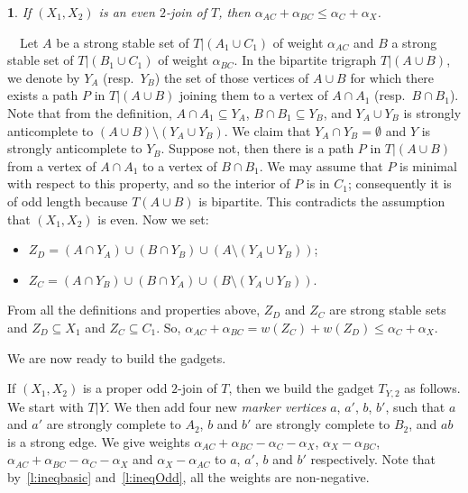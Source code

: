 \documentclass[11 pt] {article}
\newcommand\blackslug{\hbox{\hskip 1pt \vrule width 4pt height 8pt depth 1.5pt
        \hskip 1pt}}
\newcommand\bbox{\hfill \quad \blackslug \medbreak}
\newtheorem{lemma}[theorem]{}
\newcounter{claim}
\newcommand{\Proof}{\setcounter{claim}{0}\noindent{\bf Proof.}\ \ }
\begin{document}
\begin{lemma}
  \label{l:ineqEven}
  If $(X_1, X_2)$ is an even $2$-join of $T$, then
  $\alpha_{AC}+\alpha_{BC} \leq \alpha_{C}+\alpha_{X}$.
\end{lemma}

\Proof Let $A$ be a strong stable set of $T| (A_1 \cup C_1)$ of weight
$\alpha_{AC}$ and $B$ a strong stable set of $T | (B_1 \cup C_1)$ of
weight $\alpha_{BC}$.  In the bipartite trigraph $T | (A\cup B)$, we
denote by $Y_A$ (resp.\ $Y_B$) the set of those vertices of $A\cup B$
for which there exists a path $P$ in $T | (A \cup B)$ joining them to
a vertex of $A \cap A_1$ (resp.\ $B \cap B_1$).  Note that from the
definition, $A \cap A_1 \subseteq Y_A$, $B \cap B_1 \subseteq Y_B$,
and $Y_A\cup Y_B$ is strongly anticomplete to $(A\cup B)\setminus (Y_A
\cup Y_B)$.  We claim that $Y_A \cap Y_B = \emptyset$ and $Y$ is
strongly anticomplete to $Y_B$. Suppose not, then there is a path $P$
in $T | (A\cup B)$ from a vertex of $A \cap A_1$ to a vertex of $B
\cap B_1$.  We may assume that $P$ is minimal with respect to this
property, and so the interior of $P$ is in $C_1$; consequently it is
of odd length because $T (A\cup B)$ is bipartite.  This contradicts
the assumption that $(X_1, X_2)$ is even.  Now we set:

  \begin{itemize}
  \item $Z_D = (A \cap Y_A) \cup (B \cap Y_B) \cup (A \setminus (Y_A \cup Y_B))$;
  \item $Z_C = (A \cap Y_B) \cup (B \cap Y_A) \cup (B \setminus (Y_A \cup Y_B))$.
  \end{itemize}

  From all the definitions and properties above, $Z_D$ and $Z_C$ are
  strong stable sets and $Z_D \subseteq X_1$ and $Z_C \subseteq C_1$.
  So, $\alpha_{AC}+\alpha_{BC} = w(Z_C) + w(Z_D) \leq
  \alpha_{C}+\alpha_{X}$.  \bbox






We are now ready to build the gadgets. 

If $(X_1,X_2)$ is a proper odd $2$-join of $T$, then we build the
gadget $T_{Y,2}$ as follows. We start with $T |Y$. We then add four
new \emph{marker vertices} $a$, $a'$, $b$, $b'$, such that $a$ and
$a'$ are strongly complete to $A_2$, $b$ and $b'$ are strongly
complete to $B_2$, and $ab$ is a strong edge.  We give weights
$\alpha_{AC} + \alpha_{BC} - \alpha_{C} - \alpha_{X}$, $\alpha_X -
\alpha_{BC}$, $\alpha_{AC} + \alpha_{BC} - \alpha_{C} - \alpha_{X}$
and $\alpha_X - \alpha_{AC}$ to $a$, $a'$, $b$ and $b'$ respectively.
Note that by~\ref{l:ineqbasic} and~\ref{l:ineqOdd}, all the weights
are non-negative.
\end{document}
